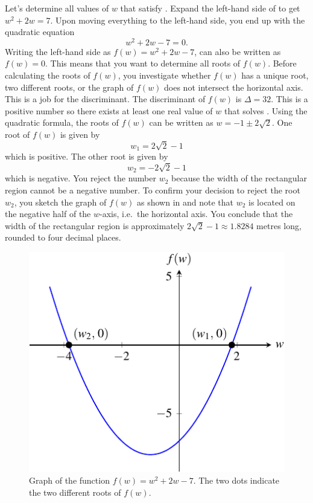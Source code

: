 \documentclass[a4paper,oneside,12pt]{article}
\begin{document}
\begin{solution}
Let's determine all values of $w$ that satisfy
.  Expand the left-hand side
of  to get $w^2 + 2w = 7$.
Upon moving everything to the left-hand side, you end up with the
quadratic equation
\begin{equation}
\label{eqn:rectangular_region_quadratic}
w^2 + 2w - 7
=
0.
\end{equation}
Writing the left-hand side as $f(w) = w^2 + 2w - 7$,
 can also be written as
$f(w) = 0$.  This means that you want to determine all roots of
$f(w)$.  Before calculating the roots of $f(w)$, you investigate
whether $f(w)$ has a unique root, two different roots, or the graph of
$f(w)$ does not intersect the horizontal axis.  This is a job for the
discriminant.  The discriminant of $f(w)$ is $\Delta = 32$.  This is a
positive number so there exists at least one real value of $w$ that
solves .  Using the
quadratic formula, the roots of $f(w)$ can be written as
$w = -1 \pm 2\sqrt{2}$.  One root of $f(w)$ is given by
\[
w_1
=
2\sqrt{2} - 1
\]
which is positive.  The other root is given by
\[
w_2
=
-2\sqrt{2} - 1
\]
which is negative.  You reject the number $w_2$ because the width of
the rectangular region cannot be a negative number.  To confirm your
decision to reject the root $w_2$, you sketch the graph of $f(w)$ as
shown in  and note that
$w_2$ is located on the negative half of the $w$-axis, i.e.~the
horizontal axis.  You conclude that the width of the rectangular
region is approximately $2\sqrt{2} - 1 \approx 1.8284$ metres long,
rounded to four decimal places.
\end{solution}

\begin{figure}[!htbp]
\centering
\includegraphics[scale=1]{image/07/a1-b2-cminus7.pdf}
\caption{%
  Graph of the function $f(w) = w^2 + 2w - 7$.  The two dots indicate
  the two different roots of $f(w)$.
}
\label{fig:rectangular_region_quadratic_roots}
\end{figure}
\end{document}
